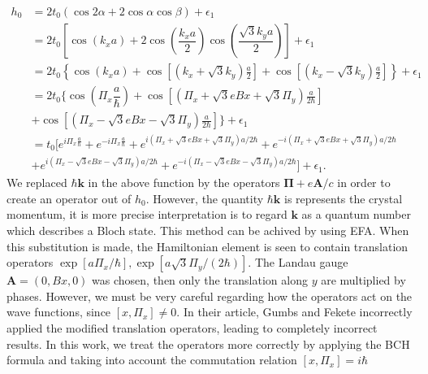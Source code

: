 \documentclass{report}
\newcommand{\f}[2]{\dfrac{#1}{#2}}
\begin{document}
\begin{equation}
	\begin{aligned}
		h_0
		 & = 2 t_0 \left(\cos2\alpha + 2\cos\alpha \cos\beta\right) + \epsilon_1                                                                                                                                     \\
		 & = 2t_{0} \left[ \cos(k_x a) + 2 \cos \left(\f{k_x a}{2}\right) \cos \left(\f{\sqrt{3}k_y a}{2}\right) \right] + \epsilon_1                                                                                \\
		 & = 2t_{0} \left\{ \cos(k_x a) + \cos\left[\left( k_{x} + \sqrt{3} k_{y} \right)\frac{a}{2}\right] + \cos\left[\left( k_{x} - \sqrt{3} k_{y} \right)\frac{a}{2}\right]\right\} + \epsilon_1                 \\
		 & = 2t_{0} \Biggl\{ \cos(\Pi_{x}\f{a}{\hbar}) + \cos \left[\left(\Pi_{x} + \sqrt{3} e B x + \sqrt{3} \Pi_{y}\right)\frac{a}{2\hbar}\right]                                                                  \\
		 & + \cos \left[\left(\Pi_{x} - \sqrt{3} e B x - \sqrt{3} \Pi_{y}\right)\frac{a}{2\hbar}\right] \Biggr\} + \epsilon_1                                                                                        \\
		 & = t_{0} \biggl[e^{i \Pi_{x}\frac{a}{\hbar}} + e^{-i\Pi_{x}\frac{a}{\hbar}} + e^{i(\Pi_{x} + \sqrt{3} eBx + \sqrt{3} \Pi_{y} ) a / 2\hbar} + e^{-i(\Pi_{x} + \sqrt{3} eBx + \sqrt{3} \Pi_{y} ) a / 2\hbar} \\
		 & + e^{i(\Pi_{x} - \sqrt{3} eBx - \sqrt{3} \Pi_{y} ) a / 2\hbar} + e^{-i(\Pi_{x} - \sqrt{3} eBx - \sqrt{3} \Pi_{y} ) a / 2\hbar} \biggr] + \epsilon_1.
	\end{aligned}
\end{equation}
We replaced $\hbar \mathbf{k}$ in the above function by the operators $\mathbf{\Pi} + e \mathbf{A} / c$ in order to create an operator out of $h_{0}$. However, the quantity $\hbar \mathbf{k}$ is represents the crystal momentum, it is more precise interpretation is to regard $\mathbf{k}$ as a quantum number which describes a Bloch state. This method can be achived by using \ac{EFA}. When this substitution is made, the Hamiltonian element is seen to contain translation operators $\exp[a \Pi_{x} / \hbar],\exp[a \sqrt{3} \Pi_{y} / (2\hbar)]$. The Landau gauge $\mathbf{A} = (0,Bx,0)$ was chosen, then only the translation along $y$ are multiplied by phases. \cite{PhysRevB.14.2239}However, we must be very careful regarding how the operators act on the wave functions, since $\left[x,\Pi_{x}\right] \neq 0$. In their article, Gumbs and Fekete \cite{gumps1997}  incorrectly applied the modified translation operators, leading to completely incorrect results. In this work, we treat the operators more correctly by applying the \ac{BCH} formula and taking into account the commutation relation $\left[x,\Pi_{x}\right] = i \hbar$
\end{document}
